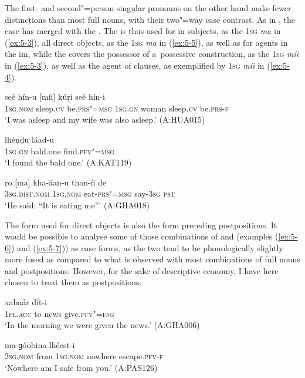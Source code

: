 The first- and second"=person singular pronouns on the other hand make fewer distinctions than most full nouns, with their two"=way case contrast. As in  , the  case has merged with the  \citep[82]{schmidtkohistani2008}. The  is thus used for in subjects, as the \textsc{1sg} \textit{ma} in (\ref{ex:5-3}), all direct objects, as the \textsc{1sg} \textit{ma} in (\ref{ex:5-5}), as well as for  agents in the im, while the  covers the possessor of a~possessive construction, as the \textsc{1sg} \textit{míi} in (\ref{ex:5-3}), as well as the agent of  clauses, as exemplified by \textsc{1sg} \textit{míi} in (\ref{ex:5-4}). 


\begin{exe}
\ex
\label{ex:5-3}
\gll [ma] seé hín-u [míi] kúṛi seé hín-i \\
	\textsc{1sg.nom} sleep.\textsc{cv} be.\textsc{prs"=msg} \textsc{1sg.gn} woman sleep.\textsc{cv} be.\textsc{prs-f} \\
\glt `I was asleep and my wife was also asleep.' (A:HUA015)

\ex
\label{ex:5-4}
\gll [míi] lhéṇḍu láad-u \\
	\textsc{1sg.gn} bald.one find.\textsc{pfv"=msg} \\
\glt `I found the bald one.' (A:KAT119)

\ex
\label{ex:5-5}
\gll ṛo [ma] kha-áan-u than-íi de \\
	\textsc{3sg.dist.nom} \textsc{1sg.nom} eat-\textsc{prs"=msg} say-\textsc{3sg} \textsc{pst} \\
\glt `He said: ``It is eating me''.' (A:GHA018)
\end{exe}

The form used for direct objects is also the form preceding postpositions. It would be possible to analyse some of those combinations of  and  (examples (\ref{ex:5-6}) and (\ref{ex:5-7})) as case forms, as the two tend to be phonologically slightly more fused as compared to what is observed with most combinations of full nouns and postpositions. However, for the sake of descriptive economy, I have here chosen to treat them as postpositions. 

\begin{exe}
\ex
\label{ex:5-6}
 xabaár dít-i \\
	1\textsc{pl}.\textsc{acc} to news give.\textsc{pfv"=fsg} \\
\glt `In the morning we were given the news.' (A:GHA006)

\ex
\label{ex:5-7}
\gll [tu díi] ma ɡóobina lhéest-i \\
\textsc{2sg.nom} from \textsc{1sg.nom} nowhere escape.\textsc{pfv-f} \\
\glt `Nowhere am I safe from you.' (A:PAS126)
\end{exe}


